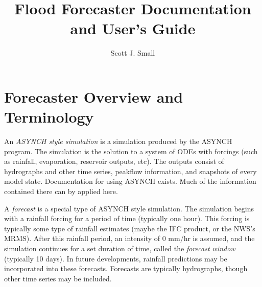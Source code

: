 \documentclass[12pt]{article}
\title{Flood Forecaster Documentation and User's Guide}
\author{Scott J. Small}
\begin{document}
\maketitle

\tableofcontents

\section{Forecaster Overview and Terminology} \label{sec: forecaster overview}

An \emph{ASYNCH style simulation} is a simulation produced by the ASYNCH program. The simulation is the solution to a system of ODEs with forcings (such as rainfall, evaporation, reservoir outputs, etc). The outputs consist of hydrographs and other time series, peakflow information, and snapshots of every model state. Documentation for using ASYNCH exists. Much of the information contained there can by applied here.

A \emph{forecast} is a special type of ASYNCH style simulation. The simulation begins with a rainfall forcing for a period of time (typically one hour). This forcing is typically some type of rainfall estimates (maybe the IFC product, or the NWS's MRMS). After this rainfall period, an intensity of 0 mm/hr is assumed, and the simulation continues for a set duration of time, called the \emph{forecast window} (typically 10 days). In future developments, rainfall predictions may be incorporated into these forecasts. Forecasts are typically hydrographs, though other time series may be included.
\end{document}
